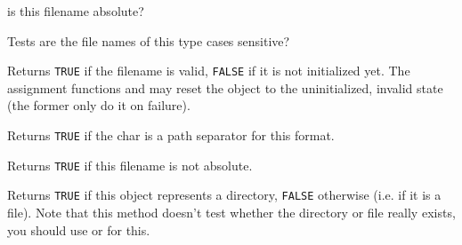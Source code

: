 

\label{wxfilenameinsertdir}



\label{wxfilenameisabsolute}


is this filename absolute?


\label{wxfilenameiscasesensitive}


Tests
are the file names of this type cases sensitive?


\label{wxfilenameisok}


Returns {\tt TRUE} if the filename is valid, {\tt FALSE} if it is not
initialized yet. The assignment functions and
 may reset the object to the uninitialized,
invalid state (the former only do it on failure).

\label{wxfilenameispathseparator}


Returns {\tt TRUE} if the char is a path separator for this format.

\label{wxfilenameisrelative}


Returns {\tt TRUE} if this filename is not absolute.

\label{wxfilenameisdir}


Returns {\tt TRUE} if this object represents a directory, {\tt FALSE} otherwise
(i.e. if it is a file). Note that this method doesn't test whether the
directory or file really exists, you should use 
 or 
 for this.

\label{wxfilenamemakerelativeto}

